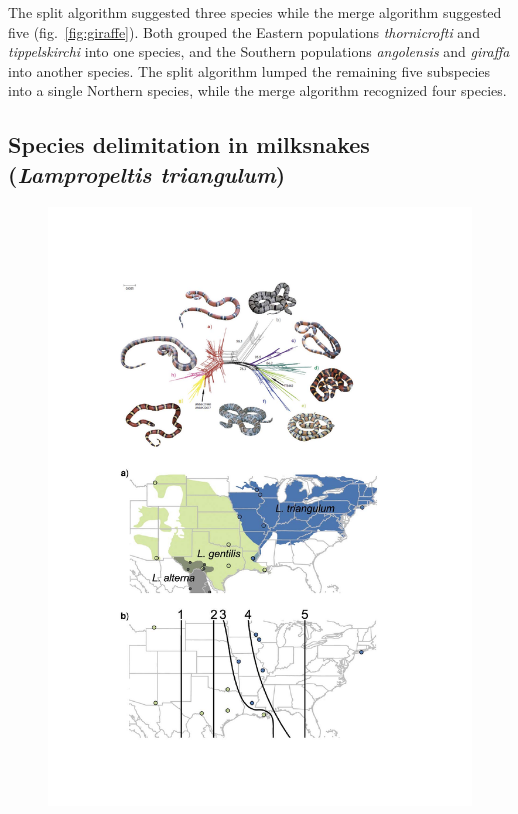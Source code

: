 \documentclass[A4]{article1}
\begin{document}
The split algorithm suggested three species while the merge
algorithm suggested five (fig.~\ref{fig:giraffe}).  Both grouped the Eastern populations
\textit{thornicrofti} and \textit{tippelskirchi} into one species, and the Southern
populations \textit{angolensis} and \textit{giraffa} into another species. The split
algorithm lumped the remaining five subspecies into a single Northern species, while the
merge algorithm recognized four species. 




\subsection{Species delimitation in milksnakes (\textit{Lampropeltis triangulum})}

\begin{figure}
    \centering %
    \includegraphics[scale=0.24]{figs/fig-miksnakes} %

\end{figure}
\end{document}
